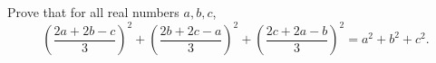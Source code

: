 Prove that for all real numbers $a,b,c$,
\[\left(\dfrac{2a+2b-c}{3}\right)^2+\left(\dfrac{2b+2c-a}{3}\right)^2+\left(\dfrac{2c+2a-b}{3}\right)^2=a^2+b^2+c^2.\]
